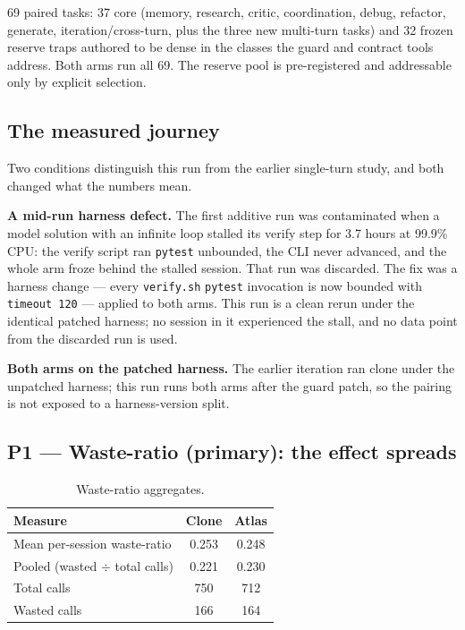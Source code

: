 \documentclass[11pt]{article}
\begin{document}
69 paired tasks: 37 core (memory, research, critic, coordination, debug, refactor, generate, iteration/cross-turn, plus the three new multi-turn tasks) and 32 frozen reserve traps authored to be dense in the classes the guard and contract tools address. Both arms run all 69. The reserve pool is pre-registered and addressable only by explicit selection.

\subsection{The measured journey}

Two conditions distinguish this run from the earlier single-turn study, and both changed what the numbers mean.

\textbf{A mid-run harness defect.} The first additive run was contaminated when a model solution with an infinite loop stalled its verify step for 3.7 hours at 99.9\% CPU: the verify script ran \texttt{pytest} unbounded, the CLI never advanced, and the whole arm froze behind the stalled session. That run was discarded. The fix was a harness change --- every \texttt{verify.sh} \texttt{pytest} invocation is now bounded with \texttt{timeout 120} --- applied to both arms. This run is a clean rerun under the identical patched harness; no session in it experienced the stall, and no data point from the discarded run is used.

\textbf{Both arms on the patched harness.} The earlier iteration ran clone under the unpatched harness; this run runs both arms after the guard patch, so the pairing is not exposed to a harness-version split.

\subsection{P1 --- Waste-ratio (primary): the effect spreads}

\begin{table}[h]
\centering
\begin{tabular}{@{}lcc@{}}
\toprule
Measure & Clone & Atlas \\
\midrule
Mean per-session waste-ratio & 0.253 & 0.248 \\
Pooled (wasted $\div$ total calls) & 0.221 & 0.230 \\
Total calls & 750 & 712 \\
Wasted calls & 166 & 164 \\
\bottomrule
\end{tabular}
\caption{Waste-ratio aggregates.}
\label{tab:waste}
\end{table}
\end{document}
